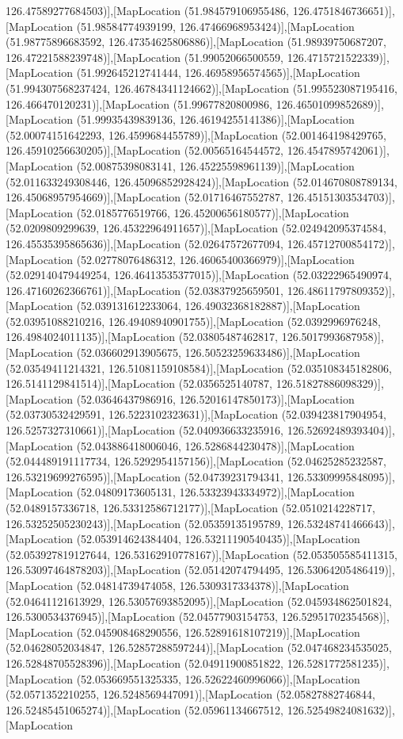 126.47589277684503)],[MapLocation (51.984579106955486, 126.4751846736651)],[MapLocation (51.98584774939199, 126.47466968953424)],[MapLocation (51.98775896683592, 126.47354625806886)],[MapLocation (51.98939750687207, 126.47221588239748)],[MapLocation (51.99052066500559, 126.4715721522339)],[MapLocation (51.992645212741444, 126.46958956574565)],[MapLocation (51.994307568237424, 126.46784341124662)],[MapLocation (51.995523087195416, 126.466470120231)],[MapLocation (51.99677820800986, 126.46501099852689)],[MapLocation (51.99935439839136, 126.46194255141386)],[MapLocation (52.00074151642293, 126.4599684455789)],[MapLocation (52.001464198429765, 126.45910256630205)],[MapLocation (52.00565164544572, 126.4547895742061)],[MapLocation (52.00875398083141, 126.45225598961139)],[MapLocation (52.011633249308446, 126.45096852928424)],[MapLocation (52.014670808789134, 126.45068957954669)],[MapLocation (52.01716467552787, 126.45151303534703)],[MapLocation (52.0185776519766, 126.45200656180577)],[MapLocation (52.0209809299639, 126.45322964911657)],[MapLocation (52.024942095374584, 126.45535395865636)],[MapLocation (52.02647572677094, 126.45712700854172)],[MapLocation (52.02778076486312, 126.46065400366979)],[MapLocation (52.029140479449254, 126.46413535377015)],[MapLocation (52.03222965490974, 126.47160262366761)],[MapLocation (52.03837925659501, 126.48611797809352)],[MapLocation (52.039131612233064, 126.49032368182887)],[MapLocation (52.03951088210216, 126.49408940901755)],[MapLocation (52.0392996976248, 126.4984024011135)],[MapLocation (52.03805487462817, 126.5017993687958)],[MapLocation (52.036602913905675, 126.50523259633486)],[MapLocation (52.03549411214321, 126.51081159108584)],[MapLocation (52.035108345182806, 126.5141129841514)],[MapLocation (52.0356525140787, 126.51827886098329)],[MapLocation (52.03646437986916, 126.52016147850173)],[MapLocation (52.03730532429591, 126.5223102323631)],[MapLocation (52.039423817904954, 126.5257327310661)],[MapLocation (52.040936633235916, 126.52692489393404)],[MapLocation (52.043886418006046, 126.5286844230478)],[MapLocation (52.044489191117734, 126.5292954157156)],[MapLocation (52.04625285232587, 126.53219699276595)],[MapLocation (52.04739231794341, 126.53309995848095)],[MapLocation (52.04809173605131, 126.53323943334972)],[MapLocation (52.0489157336718, 126.53312586712177)],[MapLocation (52.0510214228717, 126.53252505230243)],[MapLocation (52.05359135195789, 126.53248741466643)],[MapLocation (52.053914624384404, 126.53211190540435)],[MapLocation (52.053927819127644, 126.53162910778167)],[MapLocation (52.053505585411315, 126.53097464878203)],[MapLocation (52.05142074794495, 126.53064205486419)],[MapLocation (52.04814739474058, 126.5309317334378)],[MapLocation (52.04641121613929, 126.53057693852095)],[MapLocation (52.045934862501824, 126.5300534376945)],[MapLocation (52.04577903154753, 126.52951702354568)],[MapLocation (52.045908468290556, 126.52891618107219)],[MapLocation (52.04628052034847, 126.52857288597244)],[MapLocation (52.047468234535025, 126.52848705528396)],[MapLocation (52.04911900851822, 126.5281772581235)],[MapLocation (52.053669551325335, 126.52622460996066)],[MapLocation (52.0571352210255, 126.5248569447091)],[MapLocation (52.05827882746844, 126.52485451065274)],[MapLocation (52.05961134667512, 126.52549824081632)],[MapLocation 
